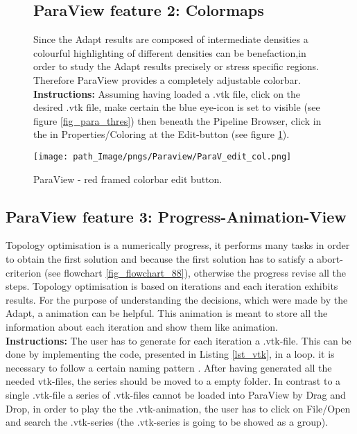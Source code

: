 \begin{figure}[!h]
\begin{minipage}{0.55 \textwidth}
\subsection{ParaView feature 2: Colormaps}
Since the Adapt results are composed of intermediate densities a colourful highlighting of different densities can be benefaction,in order to study the  Adapt results precisely or stress specific regions. Therefore ParaView provides a completely adjustable colorbar. \\

\textbf{Instructions:} Assuming having loaded a .vtk file, click on the desired .vtk file, make certain the blue eye-icon is set to visible (see figure \ref{fig_para_thres}) then beneath the Pipeline Browser, click in the in Properties/Coloring at the Edit-button (see figure \ref{fig_Para_edit_color}).
\end{minipage}
\hfill
\begin{minipage}{0.45\textwidth}
 \centering
   \texttt{[image: path\_Image/pngs/Paraview/ParaV\_edit\_col.png]}
 	\caption{ParaView - red framed colorbar edit button.} 
 	\label{fig_Para_edit_color}
\end{minipage}
 \end{figure} 
 
 

\subsection{ParaView feature 3: Progress-Animation-View}
Topology optimisation is a numerically progress, it performs many tasks in order to obtain the first solution and because the first solution has to satisfy a abort-criterion (see flowchart \ref{fig_flowchart_88}), otherwise the progress revise all the steps. Topology optimisation is based on iterations and each iteration exhibits results. For the purpose of understanding the decisions, which were made by the Adapt, a animation can be helpful. This animation is meant to store  all the information about each iteration and show them like animation.\\

\textbf{Instructions:} The user has to generate for each iteration a .vtk-file. This can  be done by implementing the code, presented in Listing \ref{lst_vtk}, in a loop. it is necessary to follow a certain naming pattern  \cite{.29.11.2018b}. After having generated all the needed vtk-files, the series should be moved to a empty folder. In contrast to a single .vtk-file a series of .vtk-files cannot be loaded into ParaView by Drag and Drop, in order to play the the .vtk-animation, the user has to click on File/Open and search the .vtk-series (the .vtk-series is going to be showed as a group). 

